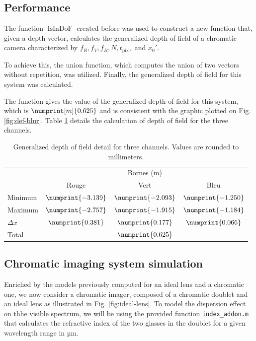 \documentclass[10pt,letterpaper]{article}
\begin{document}
\subsection*{Performance}
The function $\operatorname{IsInDoF}$ created before was used to construct a new function that, given a depth vector, calculates the generalized depth of field of a chromatic camera characterized by $f_R, f_V, f_B, N, t_{\text{pix}},$ and $x_0'$. 

To achieve this, the union function, which computes the union of two vectors without repetition, was utilized. Finally, the generalized depth of field for this system was calculated.

The function gives the value of the generalized depth of field for this system, which is $\numprint[m]{0.625}$ and is consistent with the graphic plotted on Fig. \ref{fig:def-blur}.
Table \ref{tab:prof_champ_RVB} details the calculation of depth of field for the three channels.
\begin{table}[h] 
    \centering
    \begin{tabular}{|l|c|c|c|} \cline{2-4}
   \multicolumn{1}{c|}{}  &  \multicolumn{3}{c|}{Bornes (m)} \\ \cline{2-4}
   \multicolumn{1}{c|}{}  &  Rouge  &  Vert & Bleu \\ \hline
   Minimum & $\numprint{-3.139}$ & $\numprint{-2.093}$ & $\numprint{-1.250}$  \\ \hline
   Maximum & $\numprint{-2.757}$ & $\numprint{-1.915}$ & $\numprint{-1.184}$ \\ \hline
   $\Delta x$ & $\numprint{0.381}$ & $\numprint{0.177}$ & $\numprint{0.066}$ \\ \hline
   Total &  \multicolumn{3}{c|}{$\numprint{0.625}$} \\ \hline
\end{tabular}
    \caption{Generalized depth of field detail for three channels. Values are rounded to millimeters.}
    \label{tab:prof_champ_RVB}
\end{table}

\subsection*{Chromatic imaging system simulation}
Enriched by the models previously computed for an ideal lens and a chromatic one, we now consider a chromatic imager, composed of a chromatic doublet and an ideal lens as illustrated in Fig. \ref{fig:ideal-lens}. To model the dispersion effect on thhe visible spectrum, we will be using the provided function \texttt{index\_addon.m} that calculates the refractive index of the two glasses in the doublet for a given wavelength range in µm.
\end{document}
